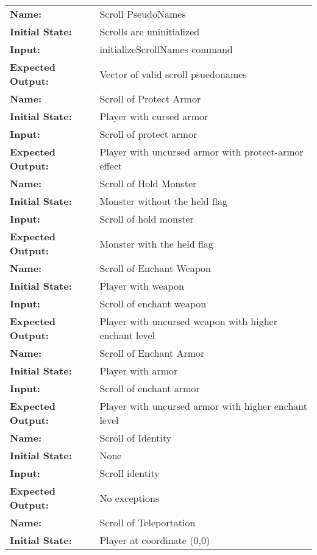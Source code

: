 \documentclass[12pt, titlepage]{article}
\begin{document}
\begin{center}
\begin{longtable}{ l | p{10cm} }
				\hline
				\rule{0pt}{2em}\textbf{Name:} & Scroll PseudoNames\\
				\textbf{Initial State:} & Scrolls are uninitialized\\
				\textbf{Input:} & initializeScrollNames command\\
				\textbf{Expected Output:} & Vector of valid scroll psuedonames\\[1em]
				\hline
				\rule{0pt}{2em}\textbf{Name:} & Scroll of Protect Armor\\
				\textbf{Initial State:} & Player with cursed armor \\
				\textbf{Input:} & Scroll of protect armor\\
				\textbf{Expected Output:} & Player with uncursed armor with protect-armor effect\\[1em]
				\hline
				\rule{0pt}{2em}\textbf{Name:} & Scroll of Hold Monster\\
				\textbf{Initial State:} & Monster without the held flag\\
				\textbf{Input:} & Scroll of hold monster\\
				\textbf{Expected Output:} & Monster with the held flag\\[1em]
				\hline
				\rule{0pt}{2em}\textbf{Name:} & Scroll of Enchant Weapon\\
				\textbf{Initial State:} & Player with weapon\\
				\textbf{Input:} & Scroll of enchant weapon\\
				\textbf{Expected Output:} & Player with uncursed weapon with higher enchant level\\[1em]
				\hline
				\rule{0pt}{2em}\textbf{Name:} & Scroll of Enchant Armor\\
				\textbf{Initial State:} & Player with armor\\
				\textbf{Input:} & Scroll of enchant armor\\
				\textbf{Expected Output:} & Player with uncursed armor with higher enchant level\\[1em]
				\hline
				\rule{0pt}{2em}\textbf{Name:} & Scroll of Identity\\
				\textbf{Initial State:} & None\\
				\textbf{Input:} & Scroll identity\\
				\textbf{Expected Output:} & No exceptions\\[1em]
				\hline
				\rule{0pt}{2em}\textbf{Name:} & Scroll of Teleportation\\
				\textbf{Initial State:} & Player at coordinate (0,0)\\

\end{longtable}
\end{center}
\end{document}
